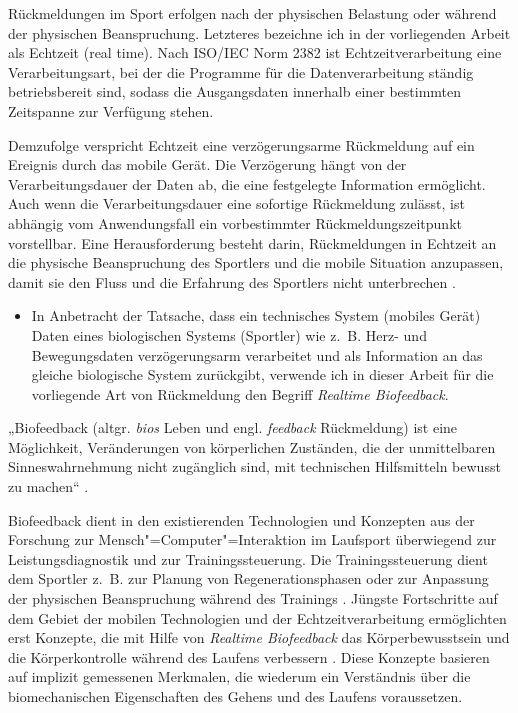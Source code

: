 Rückmeldungen im Sport erfolgen nach der physischen Belastung oder während der physischen Beanspruchung. Letzteres bezeichne ich in der vorliegenden Arbeit als Echtzeit (real time). Nach ISO/IEC Norm 2382 ist Echtzeitverarbeitung eine Verarbeitungsart, bei der die Programme für die Datenverarbeitung ständig betriebsbereit sind, sodass die Ausgangsdaten innerhalb einer bestimmten Zeitspanne zur Verfügung stehen.

Demzufolge verspricht Echtzeit eine verzögerungsarme Rückmeldung auf ein Ereignis durch das mobile Gerät. Die Verzögerung hängt von der Verarbeitungsdauer der Daten ab, die eine festgelegte Information ermöglicht. Auch wenn die Verarbeitungsdauer eine sofortige Rückmeldung zulässt, ist abhängig vom Anwendungsfall ein vorbestimmter Rückmeldungszeitpunkt vorstellbar. Eine Herausforderung besteht darin, Rückmeldungen in Echtzeit an die physische Beanspruchung des Sportlers und die mobile Situation anzupassen, damit sie den Fluss und die Erfahrung des Sportlers nicht unterbrechen \citep{Nylander2014}. 
\begin{itemize}
	
	\item In Anbetracht der Tatsache, dass ein technisches System (mobiles Gerät) Daten eines biologischen Systems (Sportler) wie z.~B. Herz- und Bewegungsdaten verzögerungsarm verarbeitet und als Information an das gleiche biologische System zurückgibt, verwende ich in dieser Arbeit für die vorliegende Art von Rückmeldung den Begriff \emph{Realtime Biofeedback}. 
\end{itemize}

„Biofeedback (altgr. \emph{bios} Leben und engl. \emph{feedback} Rückmeldung) ist eine Möglichkeit, Veränderungen von körperlichen Zuständen, die der unmittelbaren Sinneswahrnehmung nicht zugänglich sind, mit technischen Hilfsmitteln bewusst zu machen“ \citep[][S.~483]{Riemer2015}.

Biofeedback dient in den existierenden Technologien und Konzepten aus der Forschung zur Mensch"=Computer"=Interaktion im Laufsport überwiegend zur Leistungsdiagnostik und zur Trainingssteuerung. Die Trainingssteuerung dient dem Sportler z.~B. zur Planung von Regenerationsphasen oder zur Anpassung der physischen Beanspruchung während des Trainings \citep[][S.~81-107]{Marquardt2011}. Jüngste Fortschritte auf dem Gebiet der mobilen Technologien und der Echtzeitverarbeitung ermöglichten erst Konzepte, die mit Hilfe von \emph{Realtime Biofeedback} das Körperbewusstsein und die Körperkontrolle während des Laufens verbessern \citep{Strohrmann2013, Strohrmann2013a, Strohrmann2014}. Diese Konzepte basieren auf implizit gemessenen Merkmalen, die wiederum ein Verständnis über die biomechanischen Eigenschaften des Gehens und des Laufens voraussetzen. 


